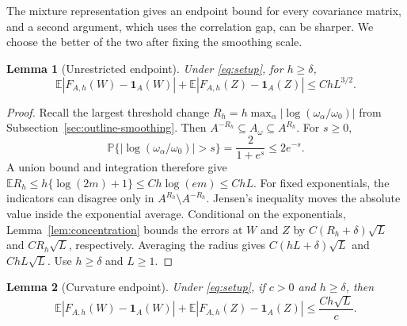 \documentclass[11pt,letterpaper]{article}
\newtheorem{lemma}{Lemma}
\theoremstyle{remark}
\newcommand{\E}{\mathbb E}
\newcommand{\Pp}{\mathbb P}
\newcommand{\ind}{\mathbf 1}
\begin{document}
The mixture representation gives an endpoint bound for every
covariance matrix, and a second argument, which uses the correlation
gap, can be sharper. We choose the better of the two after fixing the
smoothing scale.

\begin{lemma}[Unrestricted endpoint]\label{appx-lem:endpoint-free}
Under \eqref{eq:setup}, for \(h\ge\delta\),
\begin{equation}
 \E|F_{A,h}(W)-\ind_A(W)|
 +\E|F_{A,h}(Z)-\ind_A(Z)|
 \le ChL^{3/2}.
 \label{appx-eq:endpoint-free}
\end{equation}
\end{lemma}

\begin{proof}
Recall the largest threshold change
\(R_h=h\max_\alpha|\log(\omega_\alpha/\omega_0)|\)
from Subsection~\ref{sec:outline-smoothing}.
Then \(A^{-R_h}\subseteq A_{\omega}\subseteq A^{R_h}\). For \(s\ge0\),
\[
 \Pp\{|\log(\omega_\alpha/\omega_0)|>s\}
 =\frac{2}{1+e^s}\le2e^{-s}.
\]
A union bound and integration therefore give
\(\E R_h\le h\{\log(2m)+1\}\le Ch\log(em)\le ChL\).
For fixed exponentials, the indicators can disagree only in
\(A^{R_h}\setminus A^{-R_h}\). Jensen's inequality moves the absolute
value inside the exponential average. Conditional on the exponentials,
Lemma~\ref{lem:concentration} bounds the errors at \(W\) and \(Z\)
by \(C(R_h+\delta)\sqrt L\) and \(CR_h\sqrt L\), respectively.
Averaging the radius gives \(C(hL+\delta)\sqrt L\) and
\(ChL\sqrt L\).
Use \(h\ge\delta\) and \(L\ge1\).
\end{proof}

\begin{lemma}[Curvature endpoint]\label{appx-lem:endpoint-gap}
Under \eqref{eq:setup}, if \(c>0\) and \(h\ge\delta\), then
\begin{equation}
 \E|F_{A,h}(W)-\ind_A(W)|
 +\E|F_{A,h}(Z)-\ind_A(Z)|
 \le \frac{Ch\sqrt L}{c}.
 \label{appx-eq:endpoint-gap}
\end{equation}
\end{lemma}
\end{document}
